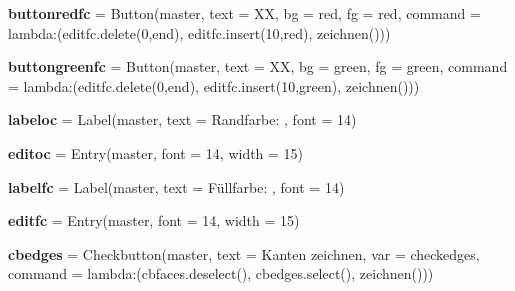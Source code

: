 \begin{DoxyCompactItemize}
\mbox{\label{namespacelatest_a2a5e7d69ec09e402ae49066da28800d9}} 
{\bfseries buttonredfc} = Button(master, text = \textquotesingle{}XX\textquotesingle{}, bg = \textquotesingle{}red\textquotesingle{}, fg = \textquotesingle{}red\textquotesingle{}, command = lambda\+:(editfc.\+delete(0,\textquotesingle{}end\textquotesingle{}), editfc.\+insert(10,\textquotesingle{}red\textquotesingle{}), zeichnen()))
\item 
\mbox{\label{namespacelatest_aaefd096a6cccde5f7eb064110db48eab}} 
{\bfseries buttongreenfc} = Button(master, text = \textquotesingle{}XX\textquotesingle{}, bg = \textquotesingle{}green\textquotesingle{}, fg = \textquotesingle{}green\textquotesingle{}, command = lambda\+:(editfc.\+delete(0,\textquotesingle{}end\textquotesingle{}), editfc.\+insert(10,\textquotesingle{}green\textquotesingle{}), zeichnen()))
\item 
\mbox{\label{namespacelatest_a63a7cb9f855d2add002e0ee848e4cf26}} 
{\bfseries labeloc} = Label(master, text = \textquotesingle{}Randfarbe\+: \textquotesingle{}, font = \textquotesingle{}14\textquotesingle{})
\item 
\mbox{\label{namespacelatest_a4e5be737c62840abc1686058a262c8aa}} 
{\bfseries editoc} = Entry(master, font = \textquotesingle{}14\textquotesingle{}, width = 15)
\item 
\mbox{\label{namespacelatest_a565bf7ec299d71786632796825c50bea}} 
{\bfseries labelfc} = Label(master, text = \textquotesingle{}Füllfarbe\+: \textquotesingle{}, font = \textquotesingle{}14\textquotesingle{})
\item 
\mbox{\label{namespacelatest_a672a60299d546c1f4260375d806b13f4}} 
{\bfseries editfc} = Entry(master, font = \textquotesingle{}14\textquotesingle{}, width = 15)
\item 
\mbox{\label{namespacelatest_adac7ace1b05a81cda5111356dae1abb6}} 
{\bfseries cbedges} = Checkbutton(master, text = \textquotesingle{}Kanten zeichnen\textquotesingle{}, var = checkedges, command = lambda\+:(cbfaces.\+deselect(), cbedges.\+select(), zeichnen()))
\item 
\mbox{\label{namespacelatest_a4adbdfea805bdb74d7a7e694d2a33721}} 

\end{DoxyCompactItemize}
